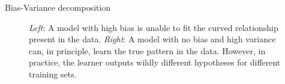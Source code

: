 \begin{vbframe} {Bias-Variance decomposition}











\framebreak

\begin{figure}
    \centering
\caption{\textit{Left}: A model with high bias is unable to fit the curved relationship present in the data. \textit{Right}: A model with no bias and high variance can, in principle, learn the true pattern in the data. However, in practice, the learner outputs wildly different hypotheses for different training sets.}
\end{figure}




\end{vbframe}


\endlecture



